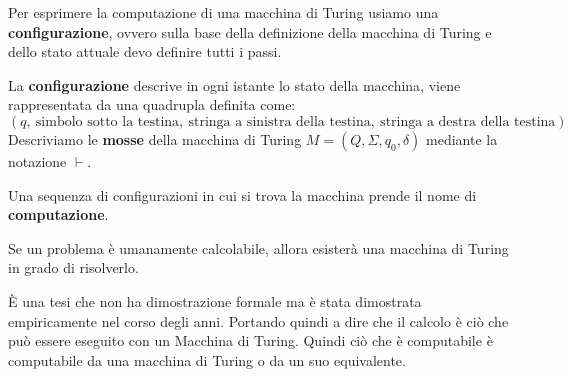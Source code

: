 Per esprimere la computazione di una macchina di Turing usiamo una
\textbf{configurazione}, ovvero sulla base della definizione della macchina di
Turing e dello stato attuale devo definire tutti i passi.

La \textbf{configurazione} descrive in ogni istante lo stato della macchina,
viene rappresentata da una quadrupla definita come:
\begin{equation}
    (q, \ \text{simbolo sotto la testina}, \
    \text{stringa a sinistra della testina}, \
    \text{stringa a destra della testina})
\end{equation}
Descriviamo le \textbf{mosse} della macchina di Turing $M = (Q, \Sigma, q_0, \delta)$
mediante la notazione $\vdash$.
\begin{definizione}[\textbf{Computazione}]
    Una sequenza di configurazioni in cui si trova la macchina prende il nome di
    \textbf{computazione}.
\end{definizione}
\begin{teorema}
    Se un problema è umanamente calcolabile, allora esisterà una macchina di
    Turing in grado di risolverlo.
\end{teorema}
È una tesi che non ha dimostrazione formale ma è stata dimostrata empiricamente
nel corso degli anni. Portando quindi a dire che il calcolo è ciò che può essere
eseguito con un Macchina di Turing. Quindi ciò che è computabile è computabile da
una macchina di Turing o da un suo equivalente.
